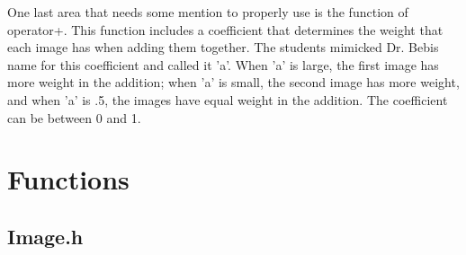 \documentclass[pdftex, 11pt]{article}
\begin{document}
One last area that needs some mention to properly use is the function of operator+. This function includes a coefficient
that determines the weight that each image has when adding them together. The students mimicked Dr. Bebis name for this
coefficient and called it 'a'. When 'a' is large, the first image has more weight in the addition; when 'a' is small,
the second image has more weight, and when 'a' is .5, the images have equal weight in the addition. The coefficient can
be between 0 and 1.

\section{Functions}

\subsection{Image.h}
\end{document}
